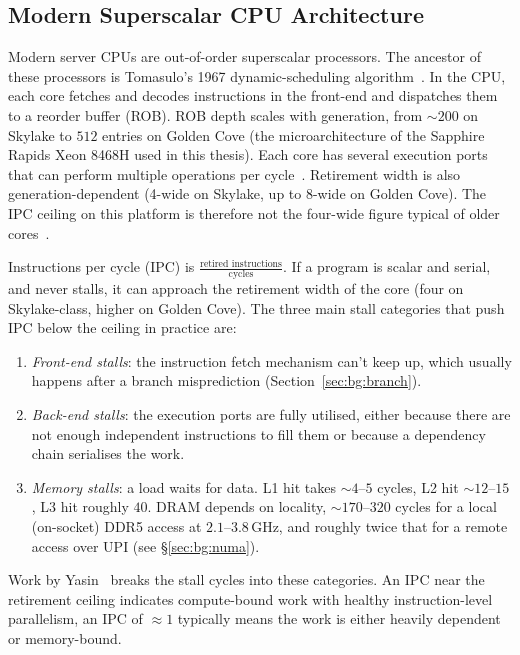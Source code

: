 \subsection{Modern Superscalar CPU Architecture\label{sec:bg:cpu}}

Modern server CPUs are out-of-order superscalar processors. The ancestor of these processors is Tomasulo's 1967 dynamic-scheduling algorithm~\cite{tomasulo_1967}. In the CPU, each core fetches and decodes instructions in the front-end and dispatches them to a reorder buffer (ROB). ROB depth scales with generation, from $\sim\!200$ on Skylake to $512$ entries on Golden Cove (the microarchitecture of the Sapphire Rapids Xeon 8468H used in this thesis). Each core has several execution ports that can perform multiple operations per cycle~\cite{hennessy_2017,fog_optimization}. Retirement width is also generation-dependent (4-wide on Skylake, up to 8-wide on Golden Cove). The IPC ceiling on this platform is therefore not the four-wide figure typical of older cores~\cite{intel_optimization_manual}.

Instructions per cycle (IPC) is $\frac{\text{retired instructions}}{\text{cycles}}$. If a program is scalar and serial, and never stalls, it can approach the retirement width of the core (four on Skylake-class, higher on Golden Cove). The three main stall categories that push IPC below the ceiling in practice are:

\begin{enumerate}
  \item \emph{Front-end stalls}: the instruction fetch mechanism can't keep up, which usually happens after a branch misprediction (Section~\ref{sec:bg:branch}).
  \item \emph{Back-end stalls}: the execution ports are fully utilised, either because there are not enough independent instructions to fill them or because a dependency chain serialises the work.
  \item \emph{Memory stalls}: a load waits for data. L1 hit takes $\sim\!4$--$5$ cycles, L2 hit $\sim\!12$--$15$, L3 hit roughly $40$. DRAM depends on locality, $\sim\!170$--$320$ cycles for a local (on-socket) DDR5 access at $2.1$--$3.8$\,GHz, and roughly twice that for a remote access over UPI (see §\ref{sec:bg:numa}).
\end{enumerate}

Work by Yasin~\cite{yasin_2014} breaks the stall cycles into these categories. An IPC near the retirement ceiling indicates compute-bound work with healthy instruction-level parallelism, an IPC of $\approx 1$ typically means the work is either heavily dependent or memory-bound.

